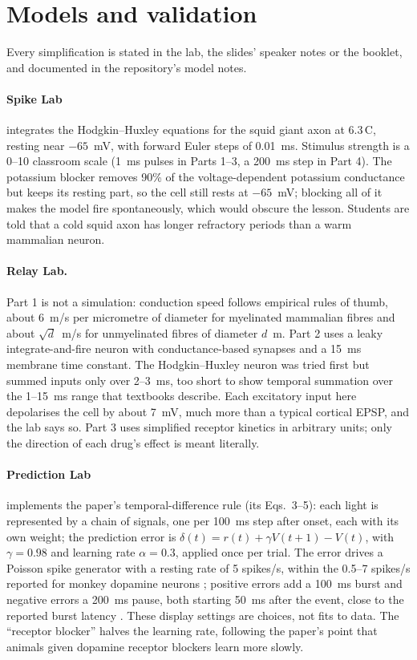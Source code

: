 \documentclass[11pt,a4paper]{article}
\begin{document}
\section{Models and validation}

Every simplification is stated in the lab, the slides' speaker notes or the booklet, and documented in the repository's model notes.

\paragraph{Spike Lab} integrates the Hodgkin--Huxley equations for the squid giant axon at 6.3\,\textdegree{}C, resting near $-65$~mV, with forward Euler steps of 0.01~ms. Stimulus strength is a 0--10 classroom scale (1~ms pulses in Parts 1--3, a 200~ms step in Part 4). The potassium blocker removes 90\% of the voltage-dependent potassium conductance but keeps its resting part, so the cell still rests at $-65$~mV; blocking all of it makes the model fire spontaneously, which would obscure the lesson. Students are told that a cold squid axon has longer refractory periods than a warm mammalian neuron.

\paragraph{Relay Lab.} Part 1 is not a simulation: conduction speed follows empirical rules of thumb, about 6~m/s per micrometre of diameter for myelinated mammalian fibres \citep{hursh1939} and about $\sqrt{d}$~m/s for unmyelinated fibres of diameter $d$~\textmu m. Part 2 uses a leaky integrate-and-fire neuron with conductance-based synapses and a 15~ms membrane time constant. The Hodgkin--Huxley neuron was tried first but summed inputs only over 2--3~ms, too short to show temporal summation over the 1--15~ms range that textbooks describe. Each excitatory input here depolarises the cell by about 7~mV, much more than a typical cortical EPSP, and the lab says so. Part 3 uses simplified receptor kinetics in arbitrary units; only the direction of each drug's effect is meant literally.

\paragraph{Prediction Lab} implements the paper's temporal-difference rule (its Eqs.~3--5): each light is represented by a chain of signals, one per 100~ms step after onset, each with its own weight; the prediction error is $\delta(t) = r(t) + \gamma V(t+1) - V(t)$, with $\gamma = 0.98$ and learning rate $\alpha = 0.3$, applied once per trial. The error drives a Poisson spike generator with a resting rate of 5 spikes/s, within the 0.5--7 spikes/s reported for monkey dopamine neurons \citep{ljungberg1992}; positive errors add a 100~ms burst and negative errors a 200~ms pause, both starting 50~ms after the event, close to the reported burst latency \citep{schultzromo1990}. These display settings are choices, not fits to data. The ``receptor blocker'' halves the learning rate, following the paper's point that animals given dopamine receptor blockers learn more slowly.
\end{document}

